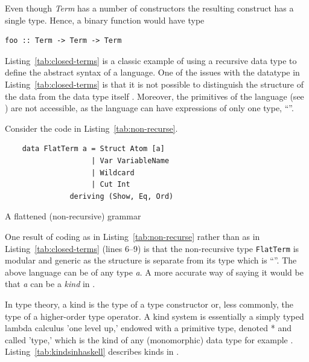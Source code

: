 \documentclass[thesis-solanki.tex]{subfiles}
\begin{document}
Even though \textit{Term} has a number of constructors the resulting construct has a single type.
Hence, a binary function would have type
\par
\begin{verbatim}
foo :: Term -> Term -> Term
\end{verbatim}

Listing~\ref{tab:closed-terms} is a classic example of using a recursive data type to define the
abstract syntax of a language.
One of the issues with the datatype in Listing~\ref{tab:closed-terms} is that it is not possible to distinguish the structure of the data from
the data type itself \cite{sheard2004two}.
Moreover, the primitives of the language (see \cite{website:understandingalgebrasfpcomplete})
are not accessible, as the language can have expressions of only one
type, ``''.

Consider the code in Listing~\ref{tab:non-recurse}.
\begin{code-list}[H]
  \begin{verbatim}
    data FlatTerm a = Struct Atom [a]
                    | Var VariableName
                    | Wildcard
                    | Cut Int
               deriving (Show, Eq, Ord)
  \end{verbatim}
  \caption{A flattened (non-recursive) grammar}
  \label{tab:non-recurse}
\end{code-list}

One result of coding as in Listing~\ref{tab:non-recurse} rather than as in
  Listing~\ref{tab:closed-terms} (lines 6--9)
  is that the non-recursive type
\texttt{FlatTerm} is modular and generic as the structure
is separate
from its
type which is ``''.
The above language can be of any type \textit{a}.
A more accurate way of saying it would be that \textit{a} can be a \textit{kind} in
.

In type theory, a kind is the type of a type constructor or, less commonly, the type of a higher-order type operator. A kind system is
essentially a simply typed lambda calculus 'one level up,' endowed with a primitive type, denoted * and called 'type,' which is the kind of
any (monomorphic) data type for example \cite{website:kindhaskellwiki}. Listing~\ref{tab:kindsinhaskell} describes kinds in 
.
\end{document}
